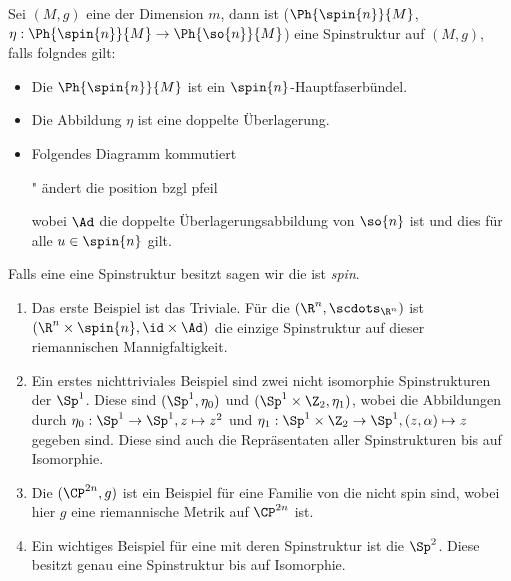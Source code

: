 \begin{Def}[Spinstruktur]
	Sei $(M,g)$ eine \RMF der Dimension $m$, dann ist
	 ($\Ph{\spin{n}}{M}$,$\eta : \Ph{\spin{n}}{M} \rightarrow \Ph{\so{n}}{M}$) eine Spinstruktur auf $(M,g)$, falls folgndes gilt:
	 \begin{itemize}
	 	\item Die \mfg $\Ph{\spin{n}}{M}$ ist ein $\spin{n}$-Hauptfaserbündel.
	 	\item Die Abbildung $\eta$ ist eine doppelte Überlagerung.
	 	\item Folgendes Diagramm kommutiert\\
		 	\begin{center}
		 		" ändert die position bzgl pfeil
			 \end{center}
			wobei $\Ad$ die doppelte Überlagerungsabbildung von $\so{n}$ ist
			und dies für alle $u \in \spin{n}$ gilt.
	 \end{itemize}
	 Falls eine \RMF eine Spinstruktur besitzt sagen wir die \mfg ist \textit{spin}.
	

\end{Def}

\begin{Bsp}
	\begin{enumerate}[(1)]
		\item Das erste Beispiel ist das Triviale. Für die \RMF $(\R^n, \scdots_{\R^n})$ ist $(\R^n \times \spin{n},\id \times \Ad)$ 
		die einzige Spinstruktur auf dieser riemannischen 
		Mannigfaltigkeit.
		\item Ein erstes nichttriviales Beispiel sind zwei nicht
		isomorphie Spinstrukturen der $\Sp^1$. Diese sind $(\Sp^1 , \eta_0)$ und $(\Sp^1 \times \Z_2 , \eta_1)$, wobei die Abbildungen durch $\eta_0 : \Sp^1 \rightarrow \Sp^1 , z \mapsto z^2$ und $\eta_1 : \Sp^1 \times \Z_2 \rightarrow \Sp^1 , (z,\alpha) \mapsto z$ gegeben sind. Diese sind auch die Repräsentaten aller Spinstrukturen bis auf 
		Isomorphie. 
		\item Die $(\CP^{2n},g)$ ist ein Beispiel für eine Familie von
		\RMFen die nicht spin sind, wobei
		hier $g$ eine riemannische Metrik
		auf $\CP^{2n}$ ist. 
		\item Ein wichtiges Beispiel für eine \RMF mit deren Spinstruktur ist die $\Sp^2$. Diese
		besitzt genau eine Spinstruktur bis auf Isomorphie. 
	\end{enumerate}
\end{Bsp}

